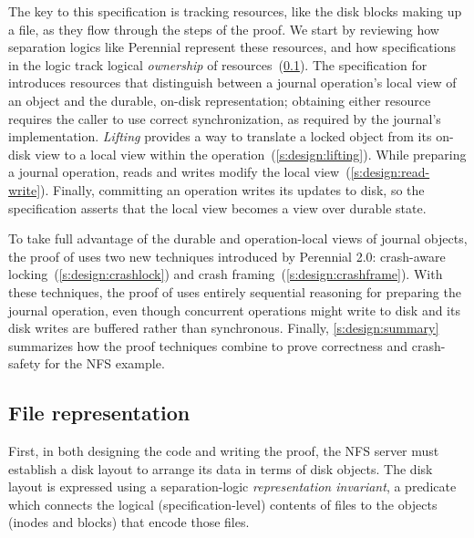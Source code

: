 The key to this specification is tracking resources, like the disk blocks making up a
file, as they flow through the steps of the proof. We start by reviewing how
separation logics like Perennial represent these resources, and how
specifications in the logic track logical \emph{ownership} of
resources~(\cref{s:design:rep}). The specification for \txn introduces
resources that distinguish between a journal operation's local view of an object and
the durable, on-disk representation; obtaining either resource
requires the caller to use correct synchronization, as required by the journal's
implementation. \emph{Lifting} provides a
way to translate
a locked object from its on-disk view to a local view within the operation~(\cref{s:design:lifting}).
While preparing a journal operation, reads and writes modify the local
view~(\cref{s:design:read-write}). Finally, committing an operation writes
its updates to disk, so the specification asserts that the local
view becomes a view over durable state.

To take full advantage of the durable and operation-local views of
journal objects, the proof of  uses two new techniques introduced by
Perennial 2.0: crash-aware locking~(\cref{s:design:crashlock}) and crash
framing~(\cref{s:design:crashframe}). With these techniques, the proof of
 uses entirely sequential reasoning for preparing the
journal operation, even though concurrent operations might write to disk and its
disk writes are buffered rather than synchronous.
Finally, \cref{s:design:summary} summarizes how the proof
techniques combine to prove correctness and crash-safety for the NFS 
example.


\subsection{File representation}
\label{s:design:rep}

First, in both designing the code and writing the proof, the NFS server must
establish a disk layout to arrange its data in terms of disk objects. The disk
layout is expressed using a separation-logic \emph{representation invariant}, a
predicate which connects the logical (specification-level) contents of files to the objects (inodes and
blocks) that encode those files.

